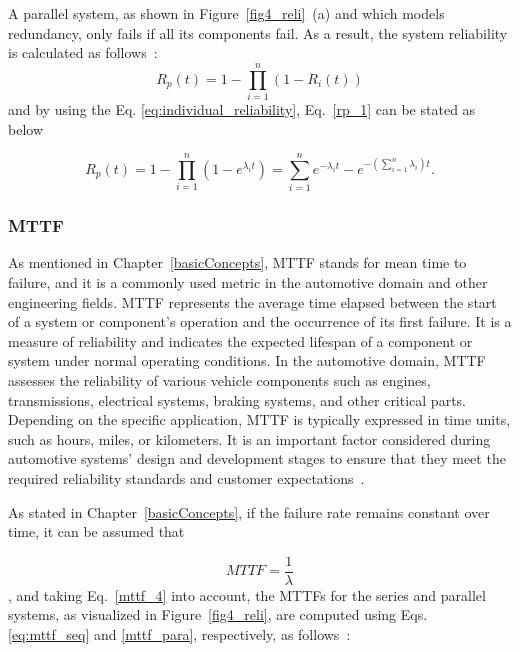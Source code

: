     
    
    
    A parallel system, as shown in Figure~\ref{fig4_reli}~(a) and which models redundancy, only fails if all its components fail. As a result, the system reliability is calculated as follows~\cite{Menčík16}:
    \begin{equation}
        R_p(t) = 1 - \prod_{i=1}^n (1 - R_i(t))
        \label{rp_1}
    \end{equation}
    and by using the Eq. \eqref{eq:individual_reliability}, Eq.~\eqref{rp_1} can be stated as below
    
    \begin{equation}
         R_p(t) = 1 - \prod_{i=1}^n (1 - e^{\lambda_i t}) = \sum_{i=1}^n e^{-\lambda_i t} - e^{-(\sum_{i=1}^n\lambda_i) t}.
    \end{equation}
    

    
    
    
    \subsubsection{MTTF}
    
    As mentioned in Chapter~\ref{basicConcepts}, MTTF stands for mean time to failure, and it is a commonly used metric in the automotive domain and other engineering fields. MTTF represents the average time elapsed between the start of a system or component's operation and the occurrence of its first failure. It is a measure of reliability and indicates the expected lifespan of a component or system under normal operating conditions.
    In the automotive domain, MTTF assesses the reliability of various vehicle components such as engines, transmissions, electrical systems, braking systems, and other critical parts.
    Depending on the specific application, MTTF is typically expressed in time units, such as hours, miles, or kilometers. It is an important factor considered during automotive systems' design and development stages to ensure that they meet the required reliability standards and customer expectations~\cite{askaripoor2023designer,askaripoor2022architecture}.
    
     As stated in Chapter~\ref{basicConcepts}, if the failure rate remains constant over time, it can be assumed that
    
    \begin{equation}
    MTTF = \frac{1}{\lambda}
    \label{mttf_4}
    \end{equation}
    , and taking Eq.~\eqref{mttf_4} into account, the MTTFs for the series and parallel systems, as visualized in Figure~\ref{fig4_reli}, are computed using Eqs. \eqref{eq:mttf_seq} and \eqref{mttf_para}, respectively, as follows~\cite{Menčík16}: 
    

